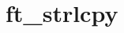 \chapter{ft\+\_\+strlcpy}
\hypertarget{md_Documentation_2ft__strlcpy}{}\label{md_Documentation_2ft__strlcpy}
